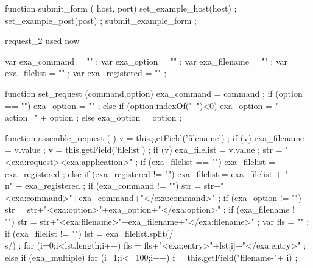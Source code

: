     function submit_form ( host, port) {
        set_example_host(host) ;
        set_example_post(post) ;
        submit_example_form ;
    }

\stopJSpreamble

\startJSpreamble request_2 used now

    var exa_command    = "" ;
    var exa_option     = "" ;
    var exa_filename   = "" ;
    var exa_filelist   = "" ;
    var exa_registered = "" ;

    function set_request (command,option) {
        exa_command = command ;
        if (option == "") {
            exa_option = "" ;
        } else { if (option.indexOf("--")<0) {
            exa_option = "--action=" + option ;
        } else {
            exa_option = option ;
        } }
    }

    function assemble_request ( ) {
        v = this.getField('filename') ;
        if (v) {
            exa_filename = v.value ;
        }
        v = this.getField('filelist') ;
        if (v) {
            exa_filelist = v.value ;
        }
        str = "<exa:request><exa:application>" ;
        if (exa_filelist == "") {
            exa_filelist = exa_registered ;
        } else { if (exa_registered != "") {
            exa_filelist = exa_filelist + "\\n" + exa_registered ;
        } }
        if (exa_command != "") {
            str = str+"<exa:command>"+exa_command+"</exa:command>" ;
        }
        if (exa_option != "") {
            str = str+"<exa:option>"+exa_option+"</exa:option>" ;
        }
        if (exa_filename != "") {
            str = str+"<exa:filename>"+exa_filename+"</exa:filename>" ;
        }
        var fls = "" ;
        if (exa_filelist != "") {
            lst = exa_filelist.split(/\\s/) ;
            for (i=0;i<lst.length;i++) {
                fls = fls+"<exa:entry>"+lst[i]+"</exa:entry>" ;
            }
        } else { if (exa_multiple) {
            for (i=1;i<=100;i++) {
                f = this.getField("filename-"+ i) ;
}}}}

